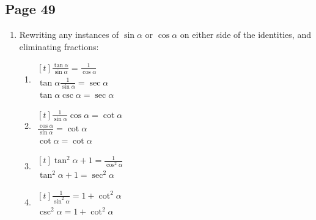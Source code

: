 \documentclass{article}
\newenvironment{solutions}[1]
{\subsection*{#1}
 \begin{enumerate}[leftmargin=1.5em]}
{\end{enumerate}}
\newcommand{\solution}{\item}
\newenvironment{subsolutions}
{\begin{enumerate}}
{\end{enumerate}}
\newcommand{\subsolution}{\item}
\begin{document}
\begin{solutions}{Page 49}
\solution %
Rewriting any instances of $\sin{\alpha}$ or $\cos{\alpha}$ on either side of the identities, and eliminating fractions:
\begin{subsolutions}

\subsolution %
$\begin{aligned}[t]
\frac{\tan{\alpha}}{\sin{\alpha}} = \frac{1}{\cos{\alpha}} \\
\tan{\alpha}\frac{1}{\sin{\alpha}} = \sec{\alpha} \\
\tan{\alpha}\csc{\alpha} = \sec{\alpha}
\end{aligned}$

\subsolution %
$\begin{aligned}[t]
\frac{1}{\sin{\alpha}}\cos{\alpha} = \cot{\alpha} \\
\frac{\cos{\alpha}}{\sin{\alpha}} = \cot{\alpha} \\
\cot{\alpha} = \cot{\alpha}
\end{aligned}$

\subsolution %
$\begin{aligned}[t]
\tan^{2}{\alpha} + 1 = \frac{1}{\cos^{2}{\alpha}} \\
\tan^{2}{\alpha} + 1 = \sec^{2}{\alpha}
\end{aligned}$

\subsolution %
$\begin{aligned}[t]
\frac{1}{\sin^{2}{\alpha}} = 1 + \cot^{2}{\alpha} \\
\csc^{2}{\alpha} = 1 + \cot^{2}{\alpha}
\end{aligned}$

\end{subsolutions}

\end{solutions}
\end{document}

